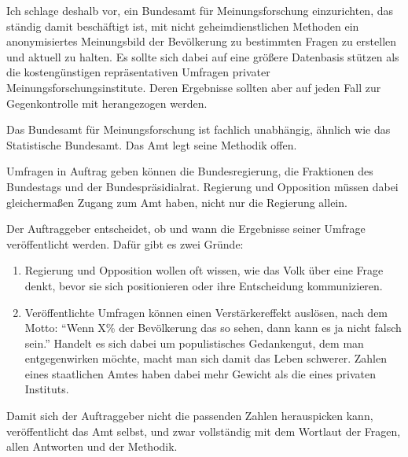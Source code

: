 Ich schlage deshalb vor, ein Bundesamt für Meinungsforschung einzurichten, das ständig damit beschäftigt ist, mit nicht geheimdienstlichen Methoden
ein anonymisiertes Meinungsbild der Bevölkerung zu bestimmten Fragen zu erstellen und aktuell zu halten.
Es sollte sich dabei auf eine größere Datenbasis stützen als die kostengünstigen repräsentativen Umfragen privater Meinungsforschungsinstitute.
Deren Ergebnisse sollten aber auf jeden Fall zur Gegenkontrolle mit herangezogen werden.

Das Bundesamt für Meinungsforschung ist fachlich unabhängig, ähnlich wie das Statistische Bundesamt.
Das Amt legt seine Methodik offen.

Umfragen in Auftrag geben können die Bundesregierung, die Fraktionen des Bundestags und der Bundespräsidialrat.
Regierung und Opposition müssen dabei gleichermaßen Zugang zum Amt haben, nicht nur die Regierung allein.

Der Auftraggeber entscheidet, ob und wann die Ergebnisse seiner Umfrage veröffentlicht werden.
Dafür gibt es zwei Gründe:
\begin{enumerate}[label=\alph*)]
    \item Regierung und Opposition wollen oft wissen, wie das Volk über eine Frage denkt, bevor sie sich positionieren oder ihre Entscheidung kommunizieren.
    \item Veröffentlichte Umfragen können einen Verstärkereffekt auslösen, nach dem Motto: \enquote{Wenn X\% der Bevölkerung das so sehen, dann kann es ja nicht falsch sein.}
    Handelt es sich dabei um populistisches Gedankengut, dem man entgegenwirken möchte, macht man sich damit das Leben schwerer.
    Zahlen eines staatlichen Amtes haben dabei mehr Gewicht als die eines privaten Instituts.
\end{enumerate}

Damit sich der Auftraggeber nicht die passenden Zahlen herauspicken kann, veröffentlicht das Amt selbst, und zwar vollständig mit dem Wortlaut der Fragen, allen Antworten und der Methodik.
